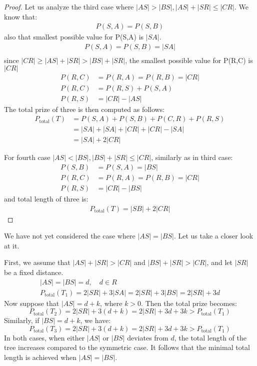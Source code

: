 \documentclass[12pt]{article}
\newcommand{\Prize}[2]{P(#1,#2)}
\newcommand{\Ptotal}[1]{P_{\text{total}}(#1)}
\newtheorem{proof}{Proof}
\begin{document}
\begin{proof}
	Let us analyze the third case where \( |AS| > |BS|, |AS|+|SR| \leq |CR| \).
	We know that:
	\begin{align*}
		\Prize{S}{A} = \Prize{S}{B}
	\end{align*}
	also that smallest possible value for \Prize{S}{A} is \(|SA|\).
	\begin{align*}	
		\Prize{S}{A} = \Prize{S}{B} = |SA| \\
	\end{align*}
	since \(|CR| \geq |AS|+|SR| > |BS|+|SR| \), the smallest possible value for \Prize{R}{C} is \(|CR|\)
	\begin{align*}
	 	\Prize{R}{C} &= \Prize{R}{A} = \Prize{R}{B} = |CR| \\
	 	\Prize{R}{C} &= \Prize{R}{S} + \Prize{S}{A} \\
	 	\Prize{R}{S} &= |CR| - |AS|
	\end{align*}
	The total prize of three is then computed as follows:
	\begin{align*}	
		\Ptotal{T} &= \Prize{S}{A} + \Prize{S}{B} + \Prize{C}{R} + \Prize{R}{S} \\
		&= |SA| + |SA| + |CR| + |CR| - |SA| \\
		&= |SA| + 2 |CR|
	\end{align*}

	For fourth case \( |AS| < |BS|, |BS|+|SR| \leq |CR| \), similarly as in third case:
	\begin{align*}
		\Prize{S}{B} &= \Prize{S}{A} = |BS| \\
		\Prize{R}{C} &= \Prize{R}{A} = \Prize{R}{B} = |CR| \\
	 	\Prize{R}{S} &= |CR| - |BS|
	\end{align*}
	and total length of three is:
	\begin{align*}	
		\Ptotal{T} = |SB| + 2 |CR|
	\end{align*}
	\end{proof}	 
		 
	We have not yet considered the case where \( |AS| = |BS| \). Let us take a closer look at it. 
	
	First, we assume that \( |AS| + |SR| > |CR| \) and \( |BS| + |SR| > |CR| \), and let \( |SR| \) be a fixed distance.
	\begin{align*}
		|AS| = |BS| = d, \quad d \in R \\
		\Ptotal{T_1} = 2|SR| + 3|SA| = 2|SR| + 3|BS| = 2|SR| + 3d
	\end{align*}
	Now suppose that \( |AS| = d + k \), where \( k > 0 \). Then the total prize becomes:
	\[
	\Ptotal{T_2} = 2|SR| + 3(d + k) = 2|SR| + 3d + 3k > \Ptotal{T_1}
	\]
	Similarly, if \( |BS| = d + k \), we have:
	\[
	\Ptotal{T_3} = 2|SR| + 3(d + k) = 2|SR| + 3d + 3k > \Ptotal{T_1}
	\]
	In both cases, when either \( |AS| \) or \( |BS| \) deviates from \( d \), the total length of the tree increases compared to the symmetric case. It follows that the minimal total length is achieved when \( |AS| = |BS| \).
	
\end{document}
